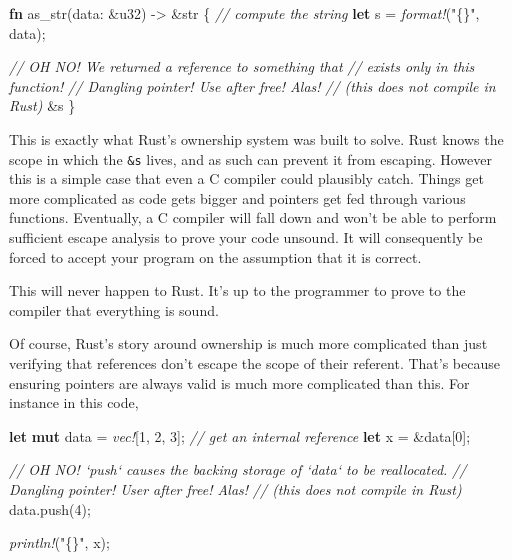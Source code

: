 \documentclass[a4paper,]{book}
\newenvironment{Shaded}{\begin{snugshade}}{\end{snugshade}}
\newcommand{\KeywordTok}[1]{\textcolor[rgb]{0.13,0.29,0.53}{\textbf{{#1}}}}
\newcommand{\DataTypeTok}[1]{\textcolor[rgb]{0.13,0.29,0.53}{{#1}}}
\newcommand{\DecValTok}[1]{\textcolor[rgb]{0.00,0.00,0.81}{{#1}}}
\newcommand{\StringTok}[1]{\textcolor[rgb]{0.31,0.60,0.02}{{#1}}}
\newcommand{\CommentTok}[1]{\textcolor[rgb]{0.56,0.35,0.01}{\textit{{#1}}}}
\newcommand{\PreprocessorTok}[1]{\textcolor[rgb]{0.56,0.35,0.01}{\textit{{#1}}}}
\newcommand{\NormalTok}[1]{{#1}}
\begin{document}
\begin{Shaded}
\begin{Highlighting}[]
\KeywordTok{fn} \NormalTok{as_str(data: &}\DataTypeTok{u32}\NormalTok{) -> &}\DataTypeTok{str} \NormalTok{\{}
    \CommentTok{// compute the string}
    \KeywordTok{let} \NormalTok{s = }\PreprocessorTok{format!}\NormalTok{(}\StringTok{"\{\}"}\NormalTok{, data);}

    \CommentTok{// OH NO! We returned a reference to something that}
    \CommentTok{// exists only in this function!}
    \CommentTok{// Dangling pointer! Use after free! Alas!}
    \CommentTok{// (this does not compile in Rust)}
    \NormalTok{&s}
\NormalTok{\}}
\end{Highlighting}
\end{Shaded}

This is exactly what Rust's ownership system was built to solve. Rust
knows the scope in which the \texttt{\&s} lives, and as such can prevent
it from escaping. However this is a simple case that even a C compiler
could plausibly catch. Things get more complicated as code gets bigger
and pointers get fed through various functions. Eventually, a C compiler
will fall down and won't be able to perform sufficient escape analysis
to prove your code unsound. It will consequently be forced to accept
your program on the assumption that it is correct.

This will never happen to Rust. It's up to the programmer to prove to
the compiler that everything is sound.

Of course, Rust's story around ownership is much more complicated than
just verifying that references don't escape the scope of their referent.
That's because ensuring pointers are always valid is much more
complicated than this. For instance in this code,

\begin{Shaded}
\begin{Highlighting}[]
\KeywordTok{let} \KeywordTok{mut} \NormalTok{data = }\PreprocessorTok{vec!}\NormalTok{[}\DecValTok{1}\NormalTok{, }\DecValTok{2}\NormalTok{, }\DecValTok{3}\NormalTok{];}
\CommentTok{// get an internal reference}
\KeywordTok{let} \NormalTok{x = &data[}\DecValTok{0}\NormalTok{];}

\CommentTok{// OH NO! `push` causes the backing storage of `data` to be reallocated.}
\CommentTok{// Dangling pointer! User after free! Alas!}
\CommentTok{// (this does not compile in Rust)}
\NormalTok{data.push(}\DecValTok{4}\NormalTok{);}

\PreprocessorTok{println!}\NormalTok{(}\StringTok{"\{\}"}\NormalTok{, x);}
\end{Highlighting}
\end{Shaded}
\end{document}
